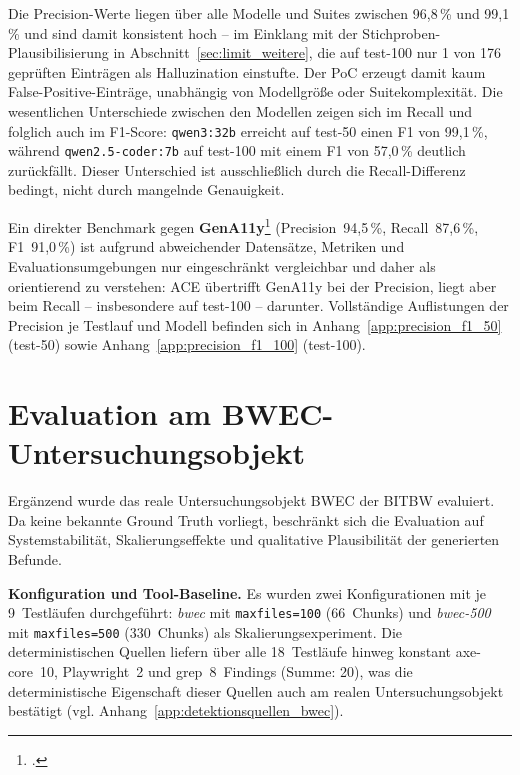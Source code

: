 Die Precision-Werte liegen über alle Modelle und Suites zwischen 96{,}8\,\% und 99{,}1\,\% und sind damit konsistent hoch -- im Einklang mit der Stichproben-Plausibilisierung in Abschnitt~\ref{sec:limit_weitere}, die auf test-100 nur 1 von 176 geprüften Einträgen als Halluzination einstufte. Der \ac{PoC} erzeugt damit kaum False-Positive-Einträge, unabhängig von Modellgröße oder Suitekomplexität. Die wesentlichen Unterschiede zwischen den Modellen zeigen sich im Recall und folglich auch im F1-Score: \texttt{qwen3:32b} erreicht auf test-50 einen F1 von 99{,}1\,\%, während \texttt{qwen2.5-coder:7b} auf test-100 mit einem F1 von 57{,}0\,\% deutlich zurückfällt. Dieser Unterschied ist ausschließlich durch die Recall-Differenz bedingt, nicht durch mangelnde Genauigkeit.

Ein direkter Benchmark gegen \textbf{GenA11y}\footcite[Vgl.][FSE101:20]{he_enhancing_2025} (Precision~94{,}5\,\%, Recall~87{,}6\,\%, F1~91,0\,\%) ist aufgrund abweichender Datensätze, Metriken und Evaluationsumgebungen nur eingeschränkt vergleichbar und daher als orientierend zu verstehen: \ac{ACE} übertrifft GenA11y bei der Precision, liegt aber beim Recall -- insbesondere auf test-100 -- darunter. Vollständige Auflistungen der Precision je Testlauf und Modell befinden sich in Anhang~\ref{app:precision_f1_50} (test-50) sowie Anhang~\ref{app:precision_f1_100} (test-100).


\section{Evaluation am \acs{BWEC}-Untersuchungsobjekt}
\label{sec:eval_bwec}

Ergänzend wurde das reale Untersuchungsobjekt \ac{BWEC} der \ac{BITBW} evaluiert. Da keine bekannte Ground Truth vorliegt, beschränkt sich die Evaluation auf Systemstabilität, Skalierungseffekte und qualitative Plausibilität der generierten Befunde.

\textbf{Konfiguration und Tool-Baseline.}
Es wurden zwei Konfigurationen mit je 9~Testläufen durchgeführt: \textit{bwec} mit \texttt{maxfiles=100} (66~Chunks) und \textit{bwec-500} mit \texttt{maxfiles=500} (330~Chunks) als Skalierungsexperiment. Die deterministischen Quellen liefern über alle 18~Testläufe hinweg konstant axe-core~10, Playwright~2 und grep~8~Findings (Summe: 20), was die deterministische Eigenschaft dieser Quellen auch am realen Untersuchungsobjekt bestätigt (vgl. Anhang~\ref{app:detektionsquellen_bwec}).

